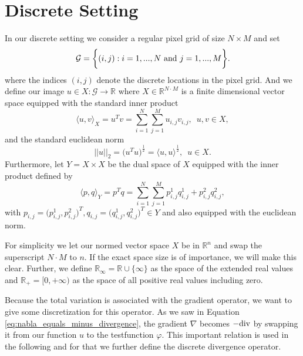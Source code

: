 \section{Discrete Setting} %
\label{sec:discrete_setting}

    In our discrete setting we consider a regular pixel grid of size $N \times M$ and set
        \begin{equation}
            \mathcal{G} = \bigg\{ (i, j) : i = 1, ..., N \,\, \textnormal{and} \,\, j = 1, ..., M \bigg\}.
            \label{eq:pixel_grid}
        \end{equation}
    where the indices $(i, j)$ denote the discrete locations in the pixel grid. And we define our image $u \in X: \mathcal{G} \longrightarrow \mathbb{R}$ where $X \in \mathbb{R}^{N \cdot M}$ is a finite dimensional vector space equipped with the standard inner product
        \begin{equation}
            \langle u, v \rangle_{X} = u^{T}v = \sum_{i = 1}^{N} \sum_{j = 1}^{M} u_{i, j} v_{i, j}, \,\,\, u, v \in X,
            \label{eq:inner_product}
        \end{equation}
    and the standard euclidean norm
        $$
            ||u||_{2} = \big( u^{T} u \big)^{\frac{1}{2}} = \langle u, u \rangle^{\frac{1}{2}}, \,\,\, u \in X.
        $$
    Furthermore, let $Y = X \times X$ be the dual space of $X$ equipped with the inner product defined by
        $$
            \langle p, q \rangle_{Y} = p^{T}q = \sum_{i = 1}^{N} \sum_{j = 1}^{M} p^{1}_{i, j} q^{1}_{i, j} + p^{2}_{i, j} q^{2}_{i, j},
        $$
    with $p_{i, j} = \big(p^{1}_{i, j}, p^{2}_{i, j}\big)^{T}, q_{i, j} = \big(q^{1}_{i, j}, q^{2}_{i, j}\big)^{T} \in Y$ and also equipped with the euclidean norm.

    For simplicity we let our normed vector space $X$ be in $\mathbb{R}^{n}$ and swap the superscript $N \cdot M$ to $n$. If the exact space size is of importance, we will make this clear. Further, we define $\mathbb{R}_{\infty} = \mathbb{R} \cup \{\infty\}$ as the space of the extended real values and $\mathbb{R}_{+} = [0, +\infty)$ as the space of all positive real values including zero.

    Because the total variation is associated with the gradient operator, we want to give some discretization for this operator. As we saw in Equation \ref{eq:nabla_equals_minus_divergence}, the gradient $\nabla$ becomes $- \textnormal{div}$ by swapping it from our function $u$ to the testfunction $\varphi$. This important relation is used in the following and for that we further define the discrete divergence operator.

